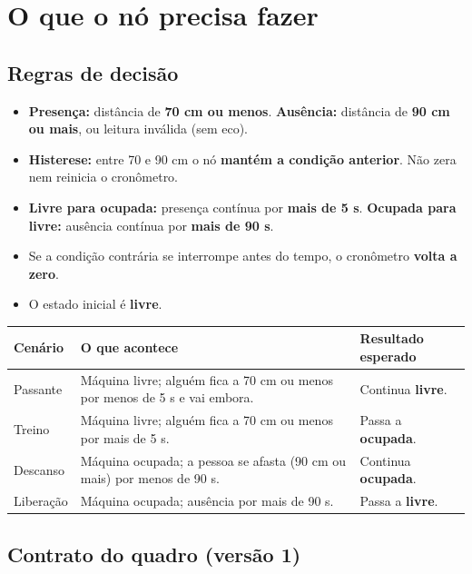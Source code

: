 \documentclass[11pt,a4paper]{article}
\begin{document}
\section{O que o nó precisa fazer}

\subsection{Regras de decisão}

\begin{itemize}
  \item \textbf{Presença:} distância de \textbf{70 cm ou menos}. \textbf{Ausência:} distância de \textbf{90 cm ou mais}, ou leitura inválida (sem eco).
  \item \textbf{Histerese:} entre 70 e 90 cm o nó \textbf{mantém a condição anterior}. Não zera nem reinicia o cronômetro.
  \item \textbf{Livre para ocupada:} presença contínua por \textbf{mais de 5 s}. \textbf{Ocupada para livre:} ausência contínua por \textbf{mais de 90 s}.
  \item Se a condição contrária se interrompe antes do tempo, o cronômetro \textbf{volta a zero}.
  \item O estado inicial é \textbf{livre}.
\end{itemize}

\begin{longtable}{|L{3.0cm}|L{6.2cm}|L{5.3cm}|}
\hline
\textbf{Cenário} & \textbf{O que acontece} & \textbf{Resultado esperado} \\ \hline
\endhead
Passante & Máquina livre; alguém fica a 70 cm ou menos por menos de 5 s e vai embora. & Continua \textbf{livre}. \\ \hline
Treino & Máquina livre; alguém fica a 70 cm ou menos por mais de 5 s. & Passa a \textbf{ocupada}. \\ \hline
Descanso & Máquina ocupada; a pessoa se afasta (90 cm ou mais) por menos de 90 s. & Continua \textbf{ocupada}. \\ \hline
Liberação & Máquina ocupada; ausência por mais de 90 s. & Passa a \textbf{livre}. \\ \hline
\end{longtable}

\subsection{Contrato do quadro (versão 1)}
\end{document}
